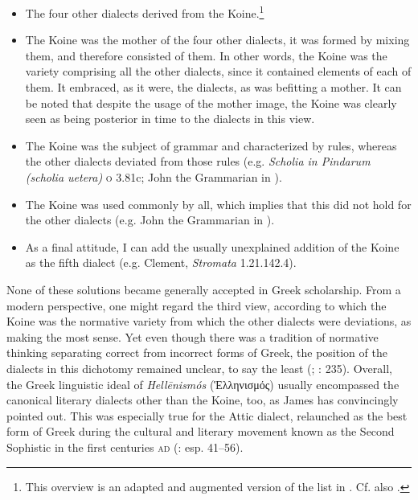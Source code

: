 \begin{itemize}
\item 
The four other dialects derived from the Koine.\footnote{This overview is an adapted and augmented version of the list in \citet[209]{VanRooy2016b}. Cf. also \citet[614--617]{Consani2000}.}

\item 
The Koine was the mother of the four other dialects, it was formed by mixing them, and therefore consisted of them. In other words, the Koine was the variety comprising all the other dialects, since it contained elements of each of them. It embraced, as it were, the dialects, as was befitting a mother. It can be noted that despite the usage of the mother image, the Koine was clearly seen as being posterior in time to the dialects in this view.

\item 
The Koine was the subject of grammar and characterized by rules, whereas the other dialects deviated from those rules (e.g. \textit{Scholia in Pindarum (scholia uetera)} \textsc{o} 3.81c; John the Grammarian in \citealt[236\textsc{\textsuperscript{v}}]{Manutius1496Thesaurus}).

\item 
The Koine was used commonly by all, which implies that this did not hold for the other dialects (e.g. John the Grammarian in \citealt[236\textsc{\textsuperscript{v}}]{Manutius1496Thesaurus}).

\item 
As a final attitude, I can add the usually unexplained addition of the Koine as the fifth dialect (e.g. Clement, \textit{Stromata} 1.21.142.4).
\end{itemize}

None of these solutions became generally accepted in Greek scholarship. From a modern perspective, one might regard the third view, according to which the Koine was the normative variety from which the other dialects were deviations, as making the most sense. Yet even though there was a tradition of normative thinking separating correct from incorrect forms of Greek, the position of the dialects in this dichotomy remained unclear, to say the least (\citealt{Versteegh1986}; \citealt{Dickey2007}: 235). Overall, the Greek linguistic ideal of \textit{Hellēnismós} (Ἑλληνισμός) usually encompassed the canonical literary dialects other than the Koine, too, as James \citet{Clackson2015} has convincingly pointed out. This was especially true for the Attic dialect, relaunched as the best form of Greek during the cultural and literary movement known as the Second Sophistic in the first centuries \textsc{ad} (\citealt{Whitmarsh2005}: esp. 41–56).

